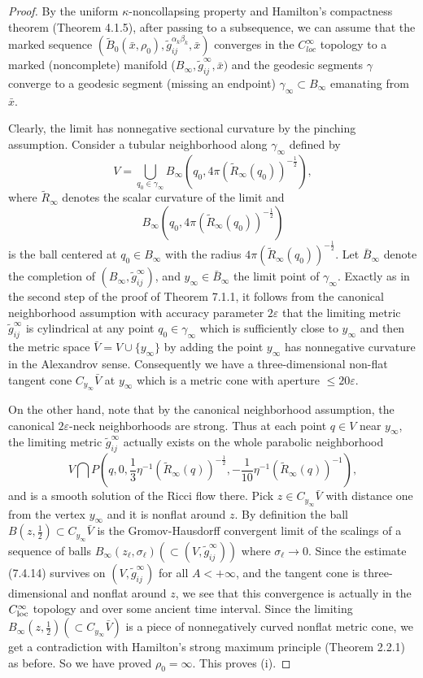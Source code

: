 \begin{proof}
By the uniform $\kappa$-noncollapsing property and Hamilton's
compactness theorem (Theorem 4.1.5), after passing to a
subsequence, we can assume that the marked sequence
$(\tilde{B}_0(\bar{x},\rho_0),\widetilde{g}^{\alpha_k\beta_k}_{ij},
\bar{x})$ converges in the $C^{\infty}_{loc}$ topology to a marked
(noncomplete) manifold
($B_{\infty},\widetilde{g}^{\infty}_{ij},\bar{x})$ and the
geodesic segments $\gamma$ converge to a geodesic segment (missing
an endpoint) $\gamma_{\infty}\subset B_{\infty}$ emanating from
$\bar{x}$.

Clearly, the limit has nonnegative sectional curvature by the
pinching assumption. Consider a tubular neighborhood along
$\gamma_{\infty}$ defined by
$$
V=\bigcup_{q_0\in\gamma_{\infty}}B_{\infty}
(q_0,4\pi(\widetilde{R}_{\infty}(q_0))^{-\frac{1}{2}}),
$$
where $\widetilde{R}_{\infty}$ denotes the scalar curvature of the
limit and
$$
B_{\infty}(q_0,4\pi(\widetilde{R}_{\infty}(q_0))^{-\frac{1}{2}})
$$
is the ball centered at $q_0\in B_{\infty}$ with the radius
$4\pi(\widetilde{R}_{\infty}(q_0))^{-\frac{1}{2}}$. Let
$\bar{B}_{\infty}$ denote the completion of
$(B_{\infty},\widetilde{g}^{\infty}_{ij})$, and
$y_{\infty}\in\bar{B}_{\infty}$ the limit point of
$\gamma_{\infty}$. Exactly as in the second step of the proof of
Theorem 7.1.1, it follows from the canonical neighborhood
assumption with accuracy parameter $2\varepsilon$ that the
limiting metric $\widetilde{g}^{\infty}_{ij}$ is cylindrical at
any point $q_0\in\gamma_{\infty}$ which is sufficiently close to
$y_{\infty}$ and then the metric space $\bar{V}=V\cup
\{y_{\infty}\}$ by adding the point $y_{\infty}$ has nonnegative
curvature in the Alexandrov sense. Consequently we have a
three-dimensional non-flat tangent cone $C_{y_{\infty}}\bar{V}$ at
$y_{\infty}$ which is a metric cone with aperture $\leq
20\varepsilon$.

On the other hand, note that by the canonical neighborhood
assumption, the canonical $2\varepsilon$-neck neighborhoods are
strong. Thus at each point $q\in V$ near $y_{\infty}$, the
limiting metric $\widetilde{g}^{\infty}_{ij}$ actually exists on
the whole parabolic neighborhood
$$
V \bigcap
P\left(q,0,\frac{1}{3}\eta^{-1}(\widetilde{R}_{\infty}(q))^{-\frac{1}{2}},
-\frac{1}{10}\eta^{-1}(\widetilde{R}_{\infty}(q))^{-1}\right),
$$
and is a smooth solution of the Ricci flow there. Pick $z\in
C_{y_{\infty}}\bar{V}$ with distance one from the vertex
$y_{\infty}$ and it is nonflat around $z$. By definition the ball
$B(z,\frac{1}{2})\subset C_{y_{\infty}}\bar{V}$ is the
Gromov-Hausdorff convergent limit of the scalings of a sequence of
balls $B_{\infty}(z_{\ell},\sigma_{\ell})
(\subset(V,\widetilde{g}^{\infty}_{ij}))$ where
$\sigma_{\ell}\rightarrow0$. Since the estimate (7.4.14) survives
on $(V,\widetilde{g}^{\infty}_{ij})$ for all $A < +\infty$, and
the tangent cone is three-dimensional and nonflat around $z$, we
see that this convergence is actually in the $C^{\infty}_{\rm
loc}$ topology and over some ancient time interval. Since the
limiting $B_{\infty}(z,\frac{1}{2})(\subset
C_{y_{\infty}}\bar{V})$ is a piece of nonnegatively curved nonflat
metric cone, we get a contradiction with Hamilton's strong maximum
principle (Theorem 2.2.1) as before. So we have proved
$\rho_0=\infty$. This proves (i).


\end{proof}
